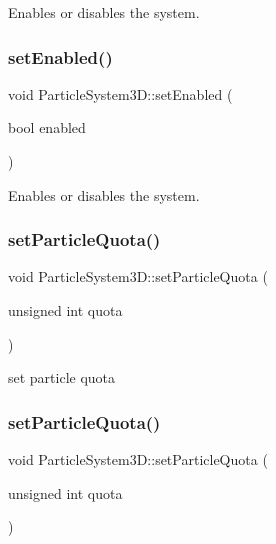 Enables or disables the system. \mbox{\label{classParticleSystem3D_a7e2e3536676b85183c6bb3e04e9f33ec}} 
\subsubsection{\texorpdfstring{set\+Enabled()}{setEnabled()}\hspace{0.1cm}{\footnotesize\ttfamily [2/2]}}
{\footnotesize\ttfamily void Particle\+System3\+D\+::set\+Enabled (\begin{DoxyParamCaption}\item[{bool}]{enabled }\end{DoxyParamCaption})}

Enables or disables the system. \mbox{\label{classParticleSystem3D_a6ab232323237daf0287d6d2e22089216}} 
\subsubsection{\texorpdfstring{set\+Particle\+Quota()}{setParticleQuota()}\hspace{0.1cm}{\footnotesize\ttfamily [1/2]}}
{\footnotesize\ttfamily void Particle\+System3\+D\+::set\+Particle\+Quota (\begin{DoxyParamCaption}\item[{unsigned int}]{quota }\end{DoxyParamCaption})}

set particle quota \mbox{\label{classParticleSystem3D_a6ab232323237daf0287d6d2e22089216}} 
\subsubsection{\texorpdfstring{set\+Particle\+Quota()}{setParticleQuota()}\hspace{0.1cm}{\footnotesize\ttfamily [2/2]}}
{\footnotesize\ttfamily void Particle\+System3\+D\+::set\+Particle\+Quota (\begin{DoxyParamCaption}\item[{unsigned int}]{quota }\end{DoxyParamCaption})}


